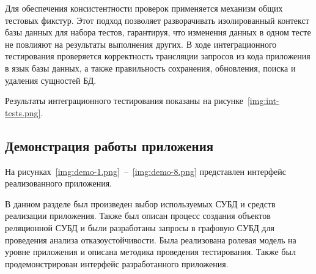 Для обеспечения консистентности проверок применяется механизм общих тестовых фикстур. 
Этот подход позволяет разворачивать изолированный контекст базы данных для набора тестов, 
гарантируя, что изменения данных в одном тесте не повлияют на результаты выполнения других. 
В ходе интеграционного тестирования проверяется корректность трансляции запросов из кода 
приложения в язык базы данных, а также правильность сохранения, обновления, поиска и удаления 
сущностей БД. 

Результаты интеграционного тестирования показаны на рисунке~\ref{img:int-tests.png}.


\subsection{Демонстрация работы приложения}

На рисунках~\ref{img:demo-1.png}~--~\ref{img:demo-8.png} представлен интерфейс
реализованного приложения.


\clearpage

В данном разделе был произведен выбор используемых СУБД и средств реализации приложения.
Также был описан процесс создания объектов реляционной СУБД и были разработаны запросы
в графовую СУБД для проведения анализа отказоустойчивости. Была реализована ролевая
модель на уровне приложения и описана методика проведения тестирования.
Также был продемонстрирован интерфейс разработанного приложения.